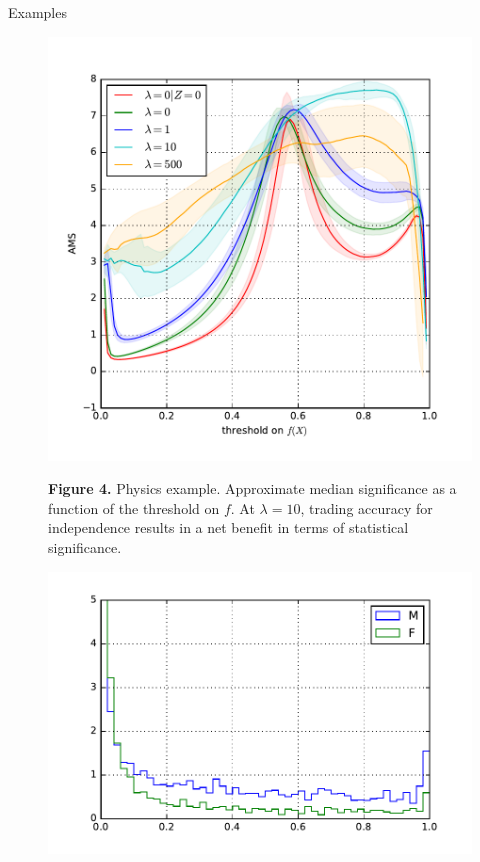 \documentclass[final,unknownkeysallowed]{beamer}
\begin{document}
\begin{frame}{}
\begin{textblock}{0.32}
\begin{block}{Examples \phantom{p}}
\begin{figure}
\begin{minipage}{.42\linewidth}
    \begin{center}
        \includegraphics[width=\textwidth]{figures/ams.pdf}\vspace{-1em}
    \end{center}
        {\bf Figure 4.} Physics example. Approximate median significance as a function of the threshold
        on $f$. At $\lambda=10$, {\color{red} trading
        accuracy for independence
        results in a net benefit in terms of statistical significance}.
\end{minipage}
\end{figure}
\vspace{-0.5cm}
\begin{figure}
\centering
\begin{minipage}{.42\linewidth}
    \begin{center}
        \includegraphics[width=\textwidth]{figures/gender-without.pdf}

\end{center}
\end{minipage}
\end{figure}
\end{block}
\end{textblock}
\end{frame}
\end{document}
